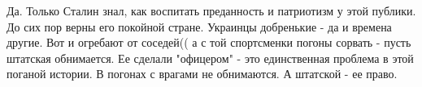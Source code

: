 \begin{itemize}
 

Да. Только Сталин знал, как воспитать преданность и патриотизм у этой публики.
До сих пор верны его покойной стране. Украинцы добренькие - да и времена
другие. Вот и огребают от соседей(( а с той спортсменки погоны сорвать - пусть
штатская обнимается. Ее сделали "офицером" - это единственная проблема в этой
поганой истории. В погонах с врагами не обнимаются. А штатской - ее право.

\end{itemize}

